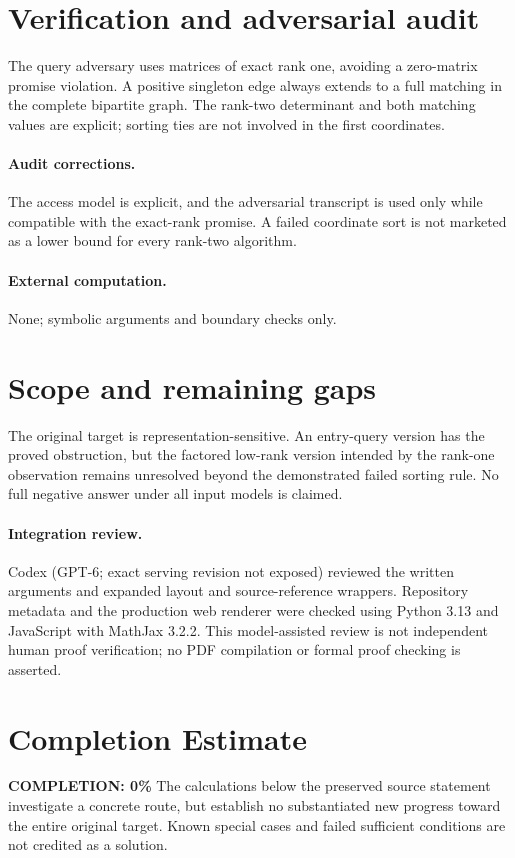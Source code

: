 \documentclass[11pt]{article}
\begin{document}
\section{Verification and adversarial audit}
The query adversary uses matrices of exact rank one, avoiding a zero-matrix promise violation. A positive singleton edge always extends to a full matching in the complete bipartite graph. The rank-two determinant and both matching values are explicit; sorting ties are not involved in the first coordinates.
\paragraph{Audit corrections.} The access model is explicit, and the adversarial transcript is used only while compatible with the exact-rank promise. A failed coordinate sort is not marketed as a lower bound for every rank-two algorithm.
\paragraph{External computation.} None; symbolic arguments and boundary checks only.
\section{Scope and remaining gaps}
The original target is representation-sensitive. An entry-query version has the proved obstruction, but the factored low-rank version intended by the rank-one observation remains unresolved beyond the demonstrated failed sorting rule. No full negative answer under all input models is claimed.
\paragraph{Integration review.} Codex (GPT-6; exact serving revision not exposed) reviewed the written arguments and expanded layout and source-reference wrappers. Repository metadata and the production web renderer were checked using Python 3.13 and JavaScript with MathJax 3.2.2. This model-assisted review is not independent human proof verification; no PDF compilation or formal proof checking is asserted.

\section{Completion Estimate}
\noindent\textbf{COMPLETION: 0\%}
The calculations below the preserved source statement investigate a concrete route,
but establish no substantiated new progress toward the entire original target.
Known special cases and failed sufficient conditions are not credited as a solution.
\end{document}
